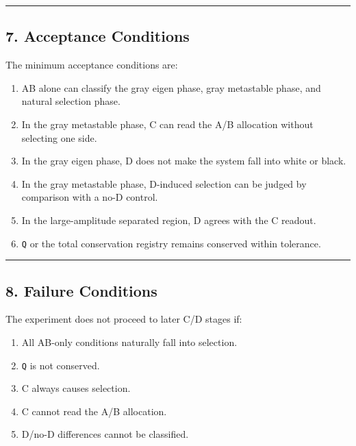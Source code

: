 \documentclass{article}
\providecommand{\tightlist}{\setlength{\itemsep}{0pt}\setlength{\parskip}{0pt}}
\begin{document}
\begin{center}\rule{0.5\linewidth}{0.5pt}\end{center}

\subsection{7. Acceptance Conditions}\label{acceptance-conditions}

The minimum acceptance conditions are:

\begin{enumerate}
\def\labelenumi{\arabic{enumi}.}
\tightlist
\item
  AB alone can classify the gray eigen phase, gray metastable phase, and
  natural selection phase.
\item
  In the gray metastable phase, C can read the A/B allocation without
  selecting one side.
\item
  In the gray eigen phase, D does not make the system fall into white or
  black.
\item
  In the gray metastable phase, D-induced selection can be judged by
  comparison with a no-D control.
\item
  In the large-amplitude separated region, D agrees with the C readout.
\item
  \texttt{Q} or the total conservation registry remains conserved within
  tolerance.
\end{enumerate}

\begin{center}\rule{0.5\linewidth}{0.5pt}\end{center}

\subsection{8. Failure Conditions}\label{failure-conditions}

The experiment does not proceed to later C/D stages if:

\begin{enumerate}
\def\labelenumi{\arabic{enumi}.}
\tightlist
\item
  All AB-only conditions naturally fall into selection.
\item
  \texttt{Q} is not conserved.
\item
  C always causes selection.
\item
  C cannot read the A/B allocation.
\item
  D/no-D differences cannot be classified.
\end{enumerate}
\end{document}
